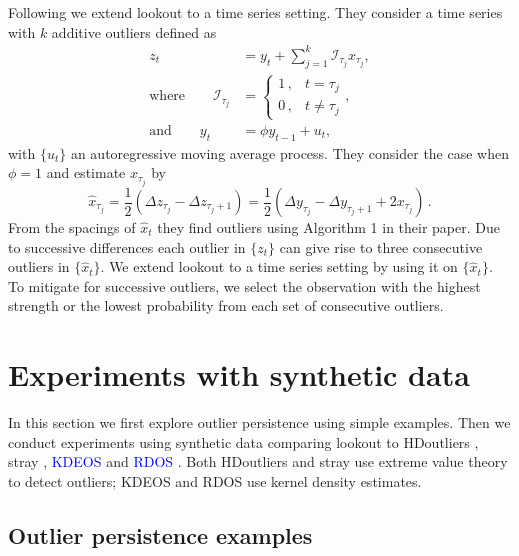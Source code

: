 \documentclass[12pt]{article}
\theoremstyle{definition}
\theoremstyle{definition}
\theoremstyle{definition}
\theoremstyle{definition}
\theoremstyle{remark}
\begin{document}
\color{blue} Following \citet{Burridge2006} we extend lookout to a time series setting. They consider a time series with \(k\) additive outliers defined as
\begin{align*}
z_t & = y_t + \sum_{j=1}^k \mathcal{I}_{\tau_j} x_{\tau_j} , \\
\text{where}\qquad
  \mathcal{I}_{\tau_j} &=  \begin{cases}
      1\, , & t = \tau_j \\
      0\, ,  & t \neq \tau_j
   \end{cases} , \\
\text{and}\qquad
y_t &= \phi y_{t-1} + u_t ,
\end{align*}
with \(\{u_t\}\) an autoregressive moving average process. They consider the case when \(\phi = 1\) and estimate \(x_{\tau_j}\) by
\[ \hat{x}_{\tau_j} = \frac{1}{2}\left(\Delta z_{\tau_j} - \Delta z_{\tau_j +1}  \right)  = \frac{1}{2}\left(\Delta y_{\tau_j} - \Delta y_{\tau_j +1}  + 2 x_{\tau_j}\right) \, .\]
From the spacings of \(\hat{x}_{t}\) they find outliers using Algorithm 1 in their paper. Due to successive differences each outlier in \(\{z_{t}\}\) can give rise to three consecutive outliers in \(\{\hat{x}_{t}\}\). We extend lookout to a time series setting by using it on \(\{\hat{x}_{t}\}\). To mitigate for successive outliers, we select the observation with the highest strength or the lowest probability from each set of consecutive outliers.

\color{black}

\hypertarget{sec:simulations}{%
\section{Experiments with synthetic data}\label{sec:simulations}}

In this section we first explore outlier persistence using simple examples. Then we conduct experiments using synthetic data comparing lookout to HDoutliers \citep{wilkinson2017visualizing}, stray \citep{stray}, \textcolor{blue}{KDEOS} \citep{Schubert2014} and \textcolor{blue}{RDOS} \citep{Tang2017}. Both HDoutliers and stray use extreme value theory to detect outliers; KDEOS and RDOS use kernel density estimates.

\hypertarget{sec:PersistenceExamples}{%
\subsection{Outlier persistence examples}\label{sec:PersistenceExamples}}
\end{document}
